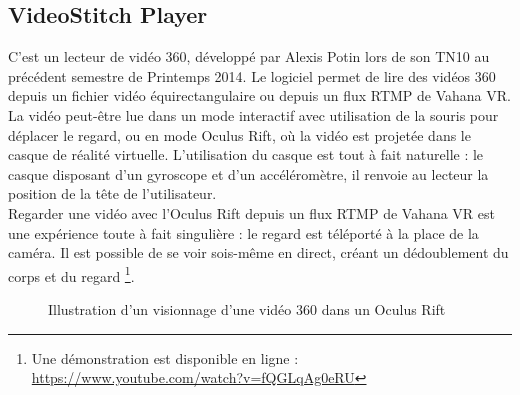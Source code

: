 \subsection{VideoStitch Player}
C'est un lecteur de vidéo 360, développé par Alexis Potin lors de son TN10 au précédent
semestre de Printemps 2014. Le logiciel permet de lire des vidéos 360 depuis un 
fichier vidéo équirectangulaire ou depuis un flux RTMP de Vahana VR. La vidéo peut-être
lue dans un mode interactif avec utilisation de la souris pour déplacer le regard,
ou en mode Oculus Rift, où la vidéo est projetée dans le casque de réalité virtuelle.
L'utilisation du casque est tout à fait naturelle : le casque disposant d'un gyroscope
et d'un accéléromètre, il renvoie au lecteur la position de la tête de l'utilisateur.\\
Regarder une vidéo avec l'Oculus Rift depuis un flux RTMP de Vahana VR est une 
expérience toute à fait singulière : le regard est téléporté à la place de la caméra.
Il est possible de se voir sois-même en direct, créant un dédoublement du corps et du regard
\footnote{Une démonstration est disponible en ligne : \url{https://www.youtube.com/watch?v=fQGLqAg0eRU}}.
\begin{figure}
  \centering
  \caption{Illustration d'un visionnage d'une vidéo 360 dans un Oculus Rift}
\end{figure}

